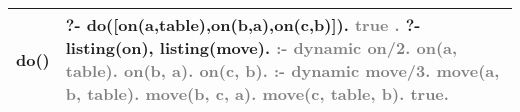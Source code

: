 \documentclass{article}
\begin{document}
\begin{tabular}{|p{6cm}|p{6cm}|}
                \hline
                    do() & ?- do([on(a,table),on(b,a),on(c,b)]).
                    \newline \textcolor{gray}{    true .}
                    \newline ?- listing(on), listing(move).
                    \newline \textcolor{gray}{:- dynamic on/2.}
                    \newline \textcolor{gray}{    on(a, table).}
                    \newline \textcolor{gray}{    on(b, a).}
                    \newline \textcolor{gray}{    on(c, b).}
                    \newline \textcolor{gray}{:- dynamic move/3.}
                    \newline \textcolor{gray}{    move(a, b, table).}
                    \newline \textcolor{gray}{    move(b, c, a).}
                    \newline \textcolor{gray}{    move(c, table, b).}
                    \newline \textcolor{gray}{    true.}\\
                \hline
            \end{tabular}
\end{document}

